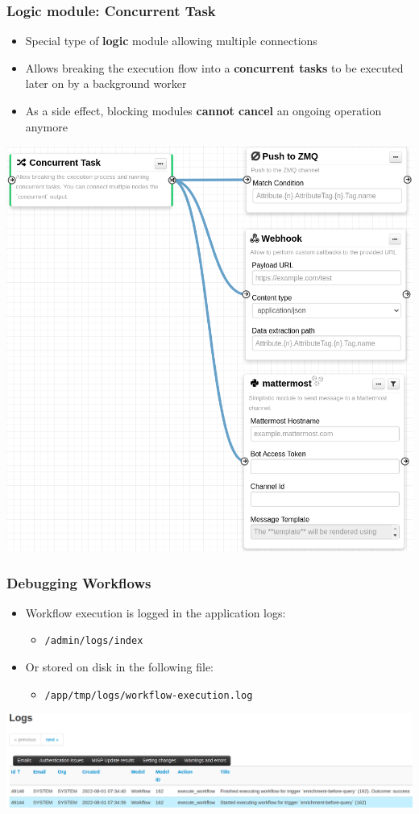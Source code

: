 \begin{frame}
    \frametitle{Logic module: Concurrent Task}
    \begin{itemize}
        \item Special type of \textbf{logic} module allowing multiple connections
        \item Allows breaking the execution flow into a \textbf{concurrent tasks} to be executed later on by a background worker
        \item As a side effect, blocking modules \textbf{cannot cancel} an ongoing operation anymore
    \end{itemize}
    \begin{center}
        \includegraphics[width=0.45\linewidth]{pictures/module-concurrent.png}
    \end{center}
\end{frame}

\begin{frame}
    \frametitle{Debugging Workflows}
    \begin{itemize}
        \item Workflow execution is logged in the application logs:
        \begin{itemize}
            \item \texttt{/admin/logs/index}
        \end{itemize}
        \item Or stored on disk in the following file:
        \begin{itemize}
            \item \texttt{/app/tmp/logs/workflow-execution.log}
        \end{itemize}
    \end{itemize}
    \begin{center}
        \includegraphics[width=1.0\linewidth]{pictures/workflow-debug.png}
    \end{center}
\end{frame}

